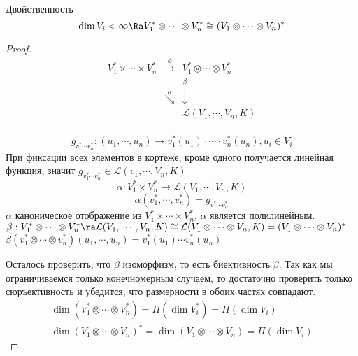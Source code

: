 \begin{theorem}{Двойственность}\hfill
$$\dim V_i < \infty \Ra V_1^* \otimes \cdots \otimes V_n^* \cong (V_1 \otimes \cdots \otimes V_n)^* $$ 
\end{theorem}
\begin{proof}
$$
\begin{matrix}
V_1^* \times \cdots \times V_n^* & \overset{\phi}{\rightarrow}& V_1^* \otimes \cdots \otimes V_n^*\\
&\overset{\alpha}{\searrow}&\overset{\beta}{\downarrow}\\
&&\mathcal{L}(V_1, \cdots, V_n, K) \\
\end{matrix}
$$

$$g_{v_1^* \cdots v_n^*} \colon (u_1, \cdots, u_n) \to v_1^*(u_1) \cdot \cdots \cdot v_n^*(u_n), u_i \in V_i$$
При фиксации всех элементов в кортеже, кроме одного получается линейная функция, 
значит $g_{v_1^* \cdots v_n^*} \in \mathcal{L}(v_1, \cdots, V_n, K)$\\
$$\alpha \colon V_1^* \times V_n^* \to \mathcal{L}(V_1, \cdots, V_n, K) $$
$$\alpha(v_1^*, \cdots, v_n^*) = g_{v_1^* \cdots v_n^*} $$
$\alpha$ каноническое отображение из $V_1^* \times \cdots \times V_n^*$, $\alpha$ является полилинейным.\\
$\beta: V_1^* \otimes \cdots \otimes V_n^* \ra \mathcal{L}(V_1, \cdots, V_n, K) \cong \mathcal{L}(V_1 \otimes \cdots \otimes V_n, K) = (V_1 \otimes \cdots \otimes V_n)^*$
$\beta(v^*_1 \otimes \cdots \otimes v^*_n)(u_1, \cdots, u_n) = v_1^*(u_1) \cdots v_n^*(u_n)$
  
Осталось проверить, что $\beta$ изоморфизм, то есть биективность $\beta$.
Так как мы ограничиваемся только конечномерным случаем, то достаточно
проверить только сюръективность и убедится, что размерности в обоих частях 
совпадают. 
\begin{gather*}
        \dim (V_1^* \otimes \cdots \otimes V_n^*) = \Pi(\dim V_i^*) = \Pi (\dim V_i)\\
        \dim (V_1 \otimes \cdots \otimes V_n)^* = \dim (V_1 \otimes \cdots \otimes V_n) = \Pi (\dim V_i)
\end{gather*}


\end{proof}
